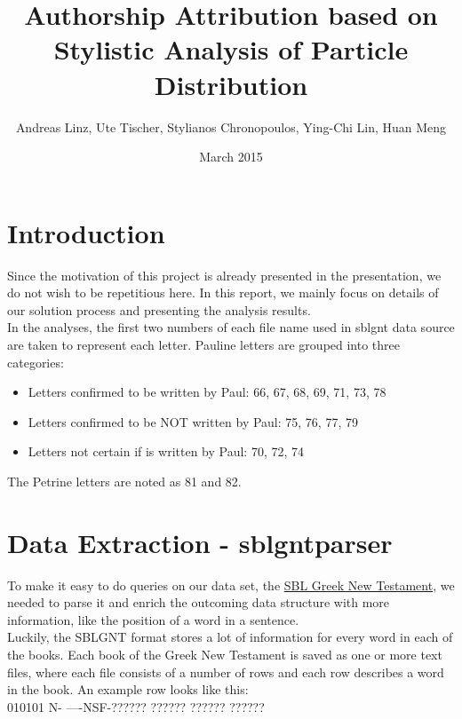\documentclass[a4paper]{article}
\renewcommand{\textgreek}[1]{{\selectlanguage{greek}#1}}
\begin{document}
\title{Authorship Attribution based on Stylistic Analysis of Particle Distribution}
\author{Andreas Linz, Ute Tischer, Stylianos Chronopoulos, Ying-Chi Lin, Huan Meng}
\date{March 2015}
\maketitle

\section{Introduction}
Since the motivation of this project is already presented in the presentation, we do not wish to be repetitious here. In this report, we mainly focus on details of our solution process and presenting the analysis results. \\

In the analyses, the first two numbers of each file name used in sblgnt data source are taken to represent each letter. Pauline letters are grouped into three categories: \\
\begin{itemize}
\item Letters confirmed to be written by Paul: 66, 67, 68, 69, 71, 73, 78 
\item Letters confirmed to be NOT written by Paul: 75, 76, 77, 79 
\item Letters not certain if is written by Paul: 70, 72, 74
\end{itemize}

The Petrine letters are noted as 81 and 82. \\

\section{Data Extraction - sblgntparser}
To make it easy to do queries on our data set, the \href{https://github.com/morphgnt/sblgnt}{SBL Greek New Testament}, we needed to parse it and enrich the outcoming data structure with more information, like the position of a word in a sentence. \\
Luckily, the SBLGNT format stores a lot of information for every word in each of the books. Each book of the Greek New Testament is saved as one or more text files, where each file consists of a number of rows and each row describes a word in the book. An example row looks like this: \\

010101 N- ----NSF-\textgreek{?????? ?????? ?????? ??????}
\end{document}

